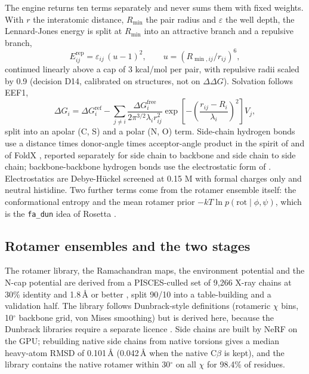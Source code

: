 \documentclass[unnumsec,webpdf,contemporary,large]{oup-authoring-template}
\begin{document}
The engine returns ten terms separately and never sums them with fixed weights. With $r$ the interatomic
distance, $R_{\min}$ the pair radius and $\varepsilon$ the well depth, the Lennard-Jones energy is split at
$R_{\min}$ into an attractive branch and a repulsive branch,
\begin{equation}
E^{\mathrm{rep}}_{ij} = \varepsilon_{ij}\,(u-1)^2,\qquad u=(R_{\min,ij}/r_{ij})^{6},
\label{eq:rep}
\end{equation}
continued linearly above a cap of 3 kcal/mol per pair, with repulsive radii scaled by 0.9 (decision D14, calibrated
on structures, not on $\Delta\Delta G$). Solvation follows EEF1,
\begin{equation}
\Delta G_i = \Delta G^{\mathrm{ref}}_i - \sum_{j \neq i} \frac{\Delta G^{\mathrm{free}}_i}{2\pi^{3/2}\lambda_i r_{ij}^2}
  \exp\!\left[-\left(\frac{r_{ij}-R_i}{\lambda_i}\right)^{2}\right] V_j ,
\label{eq:eef1}
\end{equation}
split into an apolar (C, S) and a polar (N, O) term. Side-chain hydrogen bonds use a distance times donor-angle
times acceptor-angle product in the spirit of \citet{kortemme2003} and of FoldX \citep{guerois2002}, reported
separately for side chain to backbone and side chain to side chain; backbone-backbone hydrogen bonds use the
electrostatic form of \citet{kabsch1983}. Electrostatics are Debye-H\"uckel screened at 0.15 M with formal
charges only and neutral histidine. Two further terms come from the rotamer ensemble itself: the
conformational entropy and the mean rotamer prior $-kT\ln p(\mathrm{rot}\mid\phi,\psi)$, which is the
\texttt{fa\_dun} idea of Rosetta \citep{alford2017,dunbrack1993}.

\subsection{Rotamer ensembles and the two stages}

The rotamer library, the Ramachandran maps, the environment potential and the N-cap potential are derived from a
PISCES-culled set of 9,266 X-ray chains at 30\% identity and 1.8\,\AA{} or better \citep{wang2003}, split 90/10
into a table-building and a validation half. The library follows Dunbrack-style definitions (rotameric $\chi$
bins, 10$^\circ$ backbone grid, von Mises smoothing) but is derived here, because the Dunbrack libraries require
a separate licence \citep{dunbrack1993,shapovalov2011}. Side chains are built by NeRF on the GPU; rebuilding
native side chains from native torsions gives a median heavy-atom RMSD of 0.101\,\AA{} (0.042\,\AA{} when the
native C$\beta$ is kept), and the library contains the native rotamer within 30$^\circ$ on all $\chi$ for 98.4\%
of residues.
\end{document}
